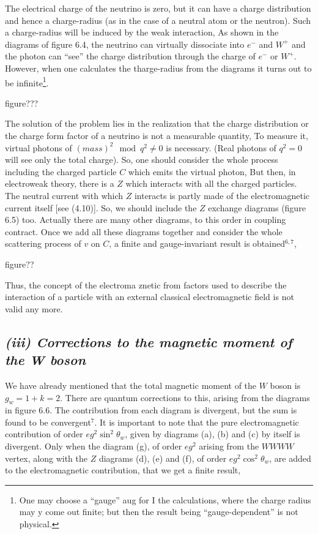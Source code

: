 The electrical charge of the neutrino is zero, but it can have a charge distribution and hence a charge-radius (as in the case of a neutral atom or the neutron). Such a charge-radius will be induced by the weak interaction, As shown in the diagrams of figure 6.4, the neutrino can virtually dissociate into $e^{-}$ and $W^{+}$ and the photon can “see” the charge distribution through the charge of $e^{-}$ or $W^{+}$. However, when one calculates the tharge-radius from the diagrams it turns out to be infinite\footnote{One may choose a “gauge” aug for I the calculations, where the charge radius may y come out finite; but then the result being “gauge-dependent” is not physical. }. 


figure???


The solution of the problem lies in the realization that the charge distribution or the charge form factor of a neutrino is not a measurable quantity, To measure it, virtual photons of $(mass)^{2} \mod q^{2} \neq 0$ is necessary. (Real photons of $q^{2}=0$ will see only the total charge). So, one should consider the whole process including the charged particle $C$ which emits the virtual photon, But then, in 
electroweak theory, there is a $Z$ which interacts with all the charged particles. The neutral current
with which $Z$ interacts is partly made of the electromagnetic current itself [see (4.10)]. So, we
should include the $Z$ exchange diagrams (figure 6.5) too. Actually there are many other diagrams,
to this order in coupling contract. Once we add all these diagrams together and consider the whole
scattering process of $v$ on $C$, a finite and gauge-invariant result is obtained$^{6,7}$, 

figure??

Thus, the concept of the electroma znetic from factors used to describe the interaction of a particle
with an external classical electromagnetic field is not valid any more. 

\subsection*{{\it (iii) Corrections to the magnetic moment of the W boson}}

We have already mentioned that the total magnetic moment of the $W$ boson is $g_{w} = 1 + k = 2$.
There are quantum corrections to this, arising from the diagrams in figure 6.6. The contribution
from each diagram is divergent, but the sum is found to be convergent$^{7}$. It is important to note
that the pure electromagnetic contribution of order $eg^{2} \sin^{2} \theta_{w}$, given by diagrams (a), (b) and (c)
by itself is divergent. Only when the diagram (g), of order $eg^{2}$ arising from the $WWWW$ vertex,
along with the $Z$ diagrams (d), (e) and (f), of order $eg^{2} \cos^{2} \theta_{w}$, are added to the electromagnetic
contribution, that we get a finite result, 

